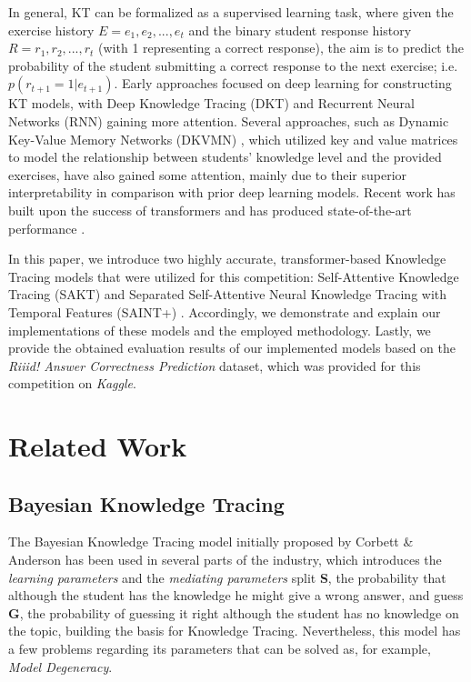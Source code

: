 \documentclass{article}
\begin{document}
In general, KT can be formalized as a supervised learning task, where given the exercise history $E= {e_1, e_2, ..., e_t}$ and the binary student response history $R = {r_1, r_2, ..., r_t}$ (with 1 representing a correct response), the aim is to predict the probability of the student submitting a correct response to the next exercise; i.e. $p(r_{t+1}=1|e_{t+1})$. Early approaches focused on deep learning for constructing KT models, with Deep Knowledge Tracing (DKT) \cite{Piech2015} and Recurrent Neural Networks (RNN) gaining more attention. Several approaches, such as Dynamic Key-Value Memory Networks (DKVMN) \cite{Zhang2017}, which utilized key and value matrices to model the relationship between students' knowledge level and the provided exercises, have also gained some attention, mainly due to their superior interpretability in comparison with prior deep learning models. Recent work has built upon the success of transformers \cite{Vaswani2017} and has produced state-of-the-art performance \cite{Choi2020}.

In this paper, we introduce two highly accurate, transformer-based Knowledge Tracing models that were utilized for this competition: Self-Attentive Knowledge Tracing (SAKT) \cite{Pandey2019} and Separated Self-Attentive Neural Knowledge Tracing with Temporal Features (SAINT+) \cite{Shin2020}. Accordingly, we demonstrate and explain our implementations of these models and the employed methodology. Lastly, we provide the obtained evaluation results of our implemented models based on the \emph{Riiid! Answer Correctness Prediction} dataset, which was provided for this competition on \emph{Kaggle}. 


\section{Related Work}

\subsection{Bayesian Knowledge Tracing}
The Bayesian Knowledge Tracing model initially proposed by Corbett \& Anderson \cite{Corbett1995} has been used in several parts of the industry, which introduces the \textit{learning parameters} and the \textit{mediating parameters} split \textbf{S}, the probability that although the student has the knowledge he might give a wrong answer, and guess \textbf{G}, the probability of guessing it right although the student has no knowledge on the topic, building the basis for Knowledge Tracing. Nevertheless, this model has a few problems \cite{Baker2008} regarding its parameters that can be solved as, for example, \textit{Model Degeneracy}.
\end{document}
